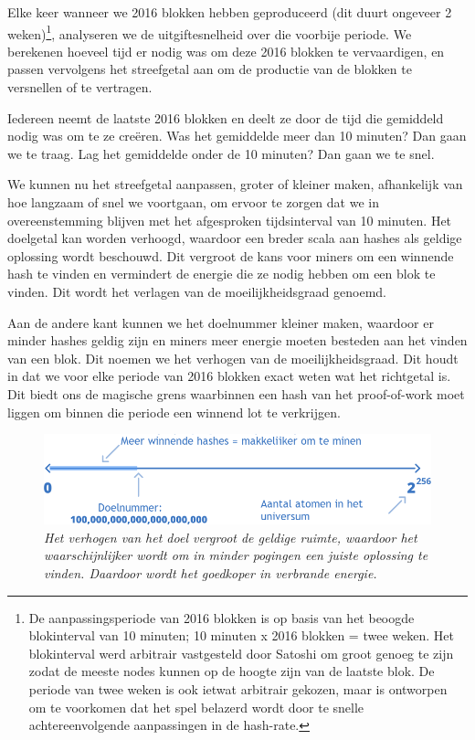Elke keer wanneer we 2016 blokken hebben geproduceerd (dit duurt ongeveer 2 weken)\footnote{De aanpassingsperiode van 2016 blokken is op basis van het beoogde blokinterval van 10 minuten; 10 minuten x 2016 blokken = twee weken. Het blokinterval werd arbitrair vastgesteld door Satoshi om groot genoeg te zijn zodat de meeste nodes kunnen op de hoogte zijn van de laatste blok. De periode van twee weken is ook ietwat arbitrair gekozen, maar is ontworpen om te voorkomen dat het spel belazerd wordt door te snelle achtereenvolgende aanpassingen in de hash-rate.}, analyseren we de uitgiftesnelheid over die voorbije periode. We berekenen hoeveel tijd er nodig was om deze 2016 blokken te vervaardigen, en passen vervolgens het streefgetal aan om de productie van de blokken te versnellen of te vertragen.

Iedereen neemt de laatste 2016 blokken en deelt ze door de tijd die gemiddeld nodig was om te ze creëren. Was het gemiddelde meer dan 10 minuten? Dan gaan we te traag. Lag het gemiddelde onder de 10 minuten? Dan gaan we te snel.

We kunnen nu het streefgetal aanpassen, groter of kleiner maken, afhankelijk van hoe langzaam of snel we voortgaan, om ervoor te zorgen dat we in overeenstemming blijven met het afgesproken tijdsinterval van 10 minuten. Het doelgetal kan worden verhoogd, waardoor een breder scala aan hashes als geldige oplossing wordt beschouwd. Dit vergroot de kans voor miners om een winnende hash te vinden en vermindert de energie die ze nodig hebben om een blok te vinden. Dit wordt het verlagen van de moeilijkheidsgraad genoemd.

Aan de andere kant kunnen we het doelnummer kleiner maken, waardoor er minder hashes geldig zijn en miners meer energie moeten besteden aan het vinden van een blok. Dit noemen we het verhogen van de moeilijkheidsgraad. Dit houdt in dat we voor elke periode van 2016 blokken exact weten wat het richtgetal is. Dit biedt ons de magische grens waarbinnen een hash van het proof-of-work moet liggen om binnen die periode een winnend lot te verkrijgen.

\begin{figure}[h]
    \centering
    \includegraphics[width=\textwidth]{images/fig8.png}
    \caption{\footnotesize{\textit{Het verhogen van het doel vergroot de geldige ruimte, waardoor het waarschijnlijker wordt om in minder pogingen een juiste oplossing te vinden. Daardoor wordt het goedkoper in verbrande \mbox{energie.}}}}
    \label{fig9}
\end{figure}


